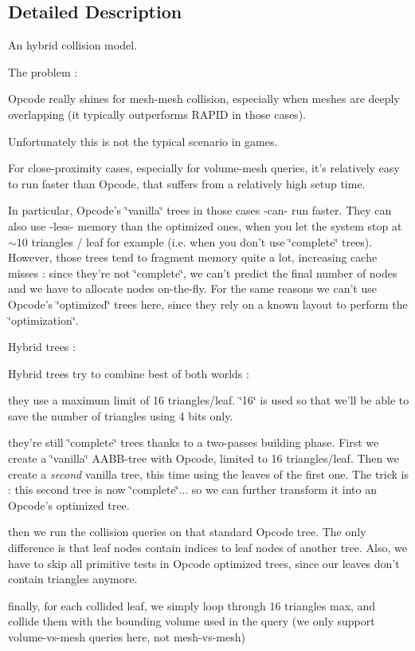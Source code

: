 \subsection{Detailed Description}
An hybrid collision model.

The problem \+:

Opcode really shines for mesh-\/mesh collision, especially when meshes are deeply overlapping (it typically outperforms R\+A\+P\+I\+D in those cases).

Unfortunately this is not the typical scenario in games.

For close-\/proximity cases, especially for volume-\/mesh queries, it's relatively easy to run faster than Opcode, that suffers from a relatively high setup time.

In particular, Opcode's \char`\"{}vanilla\char`\"{} trees in those cases -\/can-\/ run faster. They can also use -\/less-\/ memory than the optimized ones, when you let the system stop at $\sim$10 triangles / leaf for example (i.\+e. when you don't use \char`\"{}complete\char`\"{} trees). However, those trees tend to fragment memory quite a lot, increasing cache misses \+: since they're not \char`\"{}complete\char`\"{}, we can't predict the final number of nodes and we have to allocate nodes on-\/the-\/fly. For the same reasons we can't use Opcode's \char`\"{}optimized\char`\"{} trees here, since they rely on a known layout to perform the \char`\"{}optimization\char`\"{}.

Hybrid trees \+:

Hybrid trees try to combine best of both worlds \+:


\begin{DoxyItemize}
\item they use a maximum limit of 16 triangles/leaf. \char`\"{}16\char`\"{} is used so that we'll be able to save the number of triangles using 4 bits only.
\item they're still \char`\"{}complete\char`\"{} trees thanks to a two-\/passes building phase. First we create a \char`\"{}vanilla\char`\"{} A\+A\+B\+B-\/tree with Opcode, limited to 16 triangles/leaf. Then we create a {\itshape second} vanilla tree, this time using the leaves of the first one. The trick is \+: this second tree is now \char`\"{}complete\char`\"{}... so we can further transform it into an Opcode's optimized tree.
\item then we run the collision queries on that standard Opcode tree. The only difference is that leaf nodes contain indices to leaf nodes of another tree. Also, we have to skip all primitive tests in Opcode optimized trees, since our leaves don't contain triangles anymore.
\item finally, for each collided leaf, we simply loop through 16 triangles max, and collide them with the bounding volume used in the query (we only support volume-\/vs-\/mesh queries here, not mesh-\/vs-\/mesh)
\end{DoxyItemize}

